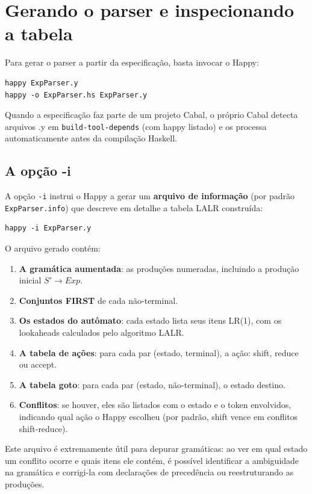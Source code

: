 \section{Gerando o parser e inspecionando a tabela}

Para gerar o parser a partir da especificação, basta invocar o Happy:

\begin{verbatim}
happy ExpParser.y
happy -o ExpParser.hs ExpParser.y
\end{verbatim}

Quando a especificação faz parte de um projeto Cabal, o próprio Cabal
detecta arquivos .y em
\verb|build-tool-depends| (com
happy listado) e os processa
automaticamente antes da compilação Haskell.

\subsection{A opção -i}

A opção \verb|-i| instrui o Happy a gerar um
\textbf{arquivo de informação} (por padrão
\verb|ExpParser.info|) que descreve em detalhe a
tabela LALR construída:

\begin{verbatim}
happy -i ExpParser.y
\end{verbatim}

O arquivo gerado contém:

\begin{enumerate}
  \item
    \textbf{A gramática aumentada}: as produções numeradas,
    incluindo a produção inicial $S' \to Exp$.
  \item
    \textbf{Conjuntos FIRST} de cada não-terminal.
  \item
    \textbf{Os estados do autômato}: cada estado lista seus itens
    LR(1), com os lookaheads calculados pelo algoritmo LALR.
  \item
    \textbf{A tabela de ações}: para cada par (estado, terminal),
    a ação: shift, reduce ou accept.
  \item
    \textbf{A tabela goto}: para cada par (estado, não-terminal),
    o estado destino.
  \item
    \textbf{Conflitos}: se houver, eles são listados com o estado
    e o token envolvidos, indicando qual ação o Happy escolheu (por
    padrão, shift vence em conflitos shift-reduce).
\end{enumerate}

Este arquivo é extremamente útil para depurar gramáticas: ao ver em
qual estado um conflito ocorre e quais itens ele contém, é possível
identificar a ambiguidade na gramática e corrigi-la com declarações
de precedência ou reestruturando as produções.

